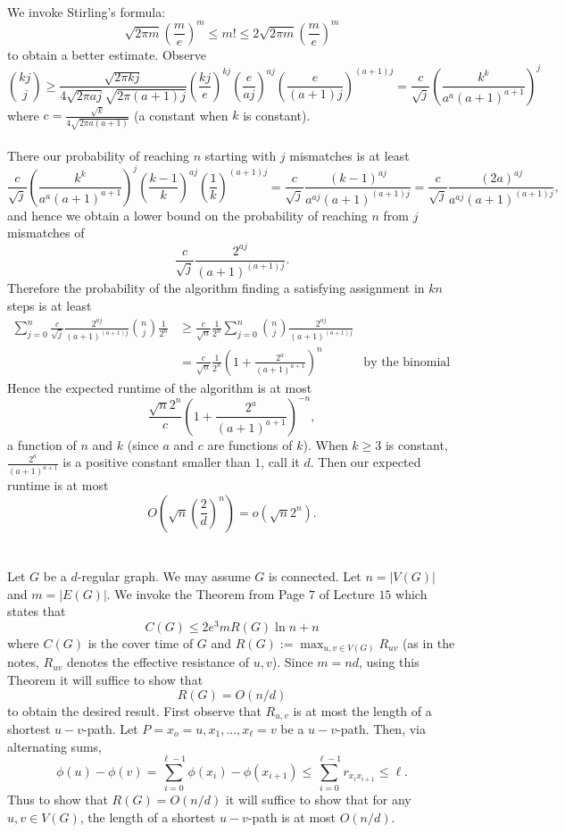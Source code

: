 \documentclass[letterpaper,12pt,oneside,onecolumn]{article}
\begin{document}
\paragraph{}
We invoke Stirling's formula:
$$\sqrt{2\pi m}(\frac{m}{e})^m \leq m! \leq 2\sqrt{2\pi m}(\frac{m}{e})^m$$
to obtain a better estimate. Observe
$${kj\choose j} \geq \frac{\sqrt{2\pi kj}}{4\sqrt{2\pi aj}\sqrt{2\pi (a+1)j}}(\frac{kj}{e})^{kj}(\frac{e}{aj})^{aj}(\frac{e}{(a+1)j})^{(a+1)j} = \frac{c}{\sqrt{j}}(\frac{k^k}{a^a(a+1)^{a+1}})^j$$
where $c = \frac{\sqrt{k}}{4\sqrt{2\pi a(a+1)}}$ (a constant when $k$ is constant).
\paragraph{}
There our probability of reaching $n$ starting with $j$ mismatches is at least
$$\frac{c}{\sqrt{j}}(\frac{k^k}{a^a(a+1)^{a+1}})^j(\frac{k-1}{k})^{aj}(\frac{1}{k})^{(a+1)j} = \frac{c}{\sqrt{j}}\frac{(k-1)^{aj}}{a^{aj}(a+1)^{(a+1)j}} = \frac{c}{\sqrt{j}}\frac{(2a)^{aj}}{a^{aj}(a+1)^{(a+1)j}},$$
and hence we obtain a lower bound on the probability of reaching $n$ from $j$ mismatches of
$$\frac{c}{\sqrt{j}}\frac{2^{aj}}{(a+1)^{(a+1)j}}.$$
Therefore the probability of the algorithm finding a satisfying assignment in $kn$ steps is at least
\begin{align*}
\sum_{j=0}^n\frac{c}{\sqrt{j}}\frac{2^{aj}}{(a+1)^{(a+1)j}} {n\choose j}\frac{1}{2^n} &\geq \frac{c}{\sqrt{n}}\frac{1}{2^n}\sum_{j=0}^n{n\choose j}\frac{2^{aj}}{(a+1)^{(a+1)j}} \\
&=\frac{c}{\sqrt{n}}\frac{1}{2^n}(1+\frac{2^a}{(a+1)^{a+1}})^n &\text{by the binomial theorem}
\end{align*}
Hence the expected runtime of the algorithm is at most
$$\frac{\sqrt{n}2^n}{c}(1+\frac{2^a}{(a+1)^{a+1}})^{-n},$$
a function of $n$ and $k$ (since $a$ and $c$ are functions of $k$). When $k\geq 3$ is constant, $\frac{2^a}{(a+1)^{a+1}}$ is a positive constant smaller than $1$, call it $d$. Then our expected runtime is at most
$$O(\sqrt{n}(\frac{2}{d})^n) = o(\sqrt{n}2^n).$$
\newpage
\section{}
Let $G$ be a $d$-regular graph. We may assume $G$ is connected. Let $n = |V(G)|$ and $m = |E(G)|$. We invoke the Theorem from Page $7$ of Lecture $15$ which states that 
$$C(G) \leq 2e^3mR(G)\ln n + n$$
where $C(G)$ is the cover time of $G$ and $R(G):=\max_{u,v\in V(G)} R_{uv}$ (as in the notes, $R_{uv}$ denotes the effective resistance of $u,v$). Since $m = nd$, using this Theorem it will suffice to show that
$$R(G) = O(n/d)$$
to obtain the desired result. First observe that $R_{u,v}$ is at most the length of a shortest $u-v$-path. Let $P=x_o=u, x_1, \dots, x_\ell=v$ be a $u-v$-path. Then, via alternating sums,
$$\phi(u) - \phi(v) = \sum_{i=0}^{\ell-1} \phi(x_i) -\phi(x_{i+1}) \leq \sum_{i=0}^{\ell-1}r_{x_ix_{i+1}} \leq \ell.$$
Thus to show that $R(G) = O(n/d)$ it will suffice to show that for any $u,v \in V(G)$, the length of a shortest $u-v$-path is at most $O(n/d)$.
\end{document}
